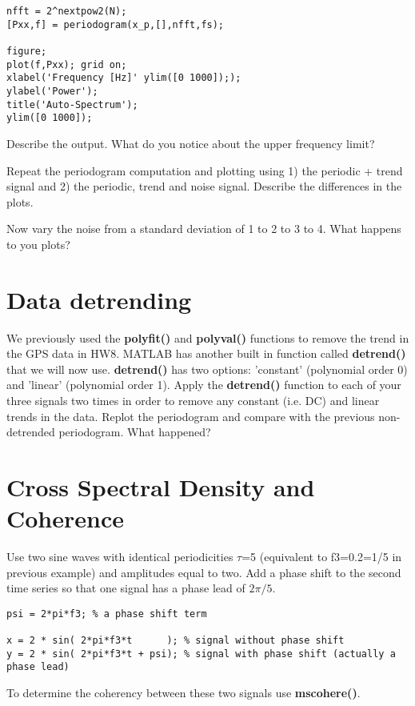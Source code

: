 \documentclass[10pt,fleqn]{article}
\begin{document}
\begin{lstlisting}
nfft = 2^nextpow2(N);
[Pxx,f] = periodogram(x_p,[],nfft,fs);

figure;
plot(f,Pxx); grid on;
xlabel('Frequency [Hz]' ylim([0 1000]););
ylabel('Power');
title('Auto-Spectrum');
ylim([0 1000]);
\end{lstlisting}

Describe the output. What do you notice about the upper frequency limit?

Repeat the periodogram computation and plotting using 1) the periodic + trend signal and 2) the periodic, trend and noise signal. Describe the differences in the plots.

Now vary the noise from a standard deviation of 1 to 2 to 3 to 4. What happens to you plots?

\section{Data detrending}

We previously used the \textbf{polyfit()} and \textbf{polyval()} functions to remove the trend in the GPS data in HW8. MATLAB has another built in function called \textbf{detrend()} that we will now use. \textbf{detrend()} has two options: 'constant' (polynomial order 0) and 'linear' (polynomial order 1). Apply the \textbf{detrend()} function to each of your three signals two times in order to remove any constant (i.e. DC) and linear trends in the data. Replot the periodogram and compare with the previous non-detrended periodogram. What happened?

\section{Cross Spectral Density and Coherence}

Use two sine waves with identical periodicities $\tau$=5 (equivalent to f3=0.2=1/5 in previous example) and amplitudes equal to two. Add a phase shift to the second time series so that one signal has a phase lead of $2\pi/5$.
\begin{lstlisting}
psi = 2*pi*f3; % a phase shift term

x = 2 * sin( 2*pi*f3*t      ); % signal without phase shift
y = 2 * sin( 2*pi*f3*t + psi); % signal with phase shift (actually a phase lead)
\end{lstlisting}

To determine the coherency between these two signals use \textbf{mscohere()}.
\end{document}

